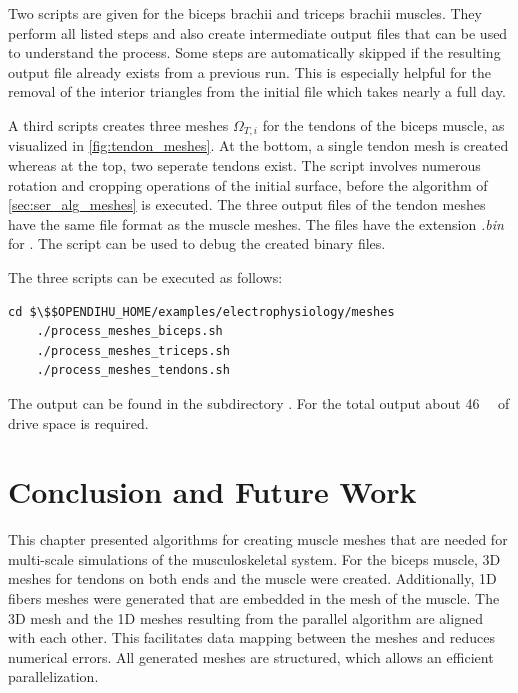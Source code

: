 \begin{reproduce}
  Two scripts are given for the biceps brachii and triceps brachii muscles. They perform all listed steps and also create intermediate output files that can be used to understand the process. Some steps are automatically skipped if the resulting output file already exists from a previous run. This is especially helpful for the removal of the interior triangles from the initial file which takes nearly a full day.
  
  A third scripts creates three meshes $\Omega_{T,i}$ for the tendons of the biceps muscle, as visualized in \cref{fig:tendon_meshes}. At the bottom, a single tendon mesh is created whereas at the top, two seperate tendons exist. The script involves numerous rotation and cropping operations of the initial surface, before the algorithm of \cref{sec:ser_alg_meshes} is executed. The three output files of the tendon meshes have the same file format as the muscle meshes. The files have the extension \emph{.bin} for . The script  can be used to debug the created binary files.
  
  The three scripts can be executed as follows:
  \begin{lstlisting}[columns=fullflexible,breaklines=true,postbreak=\mbox{\textcolor{gray}{$\hookrightarrow$}\space}]
    cd $\$$OPENDIHU_HOME/examples/electrophysiology/meshes
    ./process_meshes_biceps.sh
    ./process_meshes_triceps.sh
    ./process_meshes_tendons.sh
  \end{lstlisting}
  The output can be found in the subdirectory . For the total output about \SI{46}{\gibi\byte} of drive space is required.
  
\end{reproduce}

\section{Conclusion and Future Work}\label{sec:meshes_summary_and_conclusion}

This chapter presented algorithms for creating muscle meshes that are needed for multi-scale simulations of the musculoskeletal system.
For the biceps muscle, 3D meshes for tendons on both ends and the muscle were created. Additionally, 1D fibers meshes were generated that are embedded in the mesh of the muscle. The 3D mesh and the 1D meshes resulting from the parallel algorithm are aligned with each other. This facilitates data mapping between the meshes and reduces numerical errors. All generated meshes are structured, which allows an efficient parallelization.

